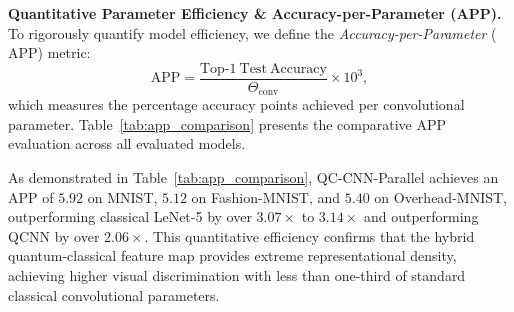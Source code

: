 \documentclass[journal]{IEEEtran}
\begin{document}
\textbf{Quantitative Parameter Efficiency \& Accuracy-per-Parameter (APP).} 
To rigorously quantify model efficiency, we define the \textit{Accuracy-per-Parameter} ($\mathrm{APP}$) metric:
\begin{equation}
\mathrm{APP} = \frac{\mathrm{Top\text{-}1\ Test\ Accuracy}}{\Theta_{\mathrm{conv}}} \times 10^3,
\label{eq:accuracy_per_parameter}
\end{equation}
which measures the percentage accuracy points achieved per convolutional parameter. Table~\ref{tab:app_comparison} presents the comparative APP evaluation across all evaluated models.

\begin{table}[!htbp]
\centering
\caption{Accuracy-per-Parameter ($\mathrm{APP}$) Efficiency Metric Across Datasets ($\times 10^3$)}
\label{tab:app_comparison}
\renewcommand{\arraystretch}{1.2}
\end{table}

As demonstrated in Table~\ref{tab:app_comparison}, QC-CNN-Parallel achieves an APP of $5.92$ on MNIST, $5.12$ on Fashion-MNIST, and $5.40$ on Overhead-MNIST, outperforming classical LeNet-5 by over $\mathbf{3.07\times}$ to $\mathbf{3.14\times}$ and outperforming QCNN by over $\mathbf{2.06\times}$. This quantitative efficiency confirms that the hybrid quantum-classical feature map provides extreme representational density, achieving higher visual discrimination with less than one-third of standard classical convolutional parameters.
\end{document}
